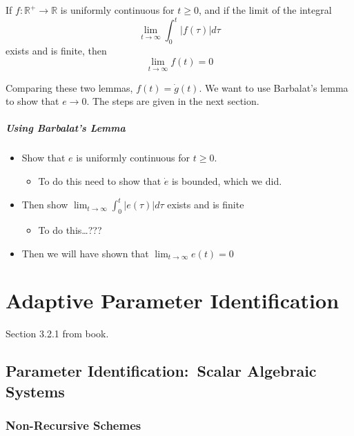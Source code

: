 \begin{lem-dan}
  If $f:\mathbb{R}^{+}\rightarrow\mathbb{R}$ is uniformly continuous for $t\geq0$, and if the limit of the integral
  \begin{equation*}
    \lim_{t\rightarrow\infty}\int_{0}^{t}|f(\tau)|d\tau
  \end{equation*}
  exists and is finite, then
  \begin{equation*}
    \lim_{t\rightarrow\infty}f(t)=0
  \end{equation*}
\end{lem-dan}

Comparing these two lemmas, $f(t)=\dot{g}(t)$.
We want to use Barbalat's lemma to show that $e\rightarrow0$.
The steps are given in the next section.

\paragraph{Using Barbalat's Lemma}

\begin{itemize}
  \item{Show that $e$ is uniformly continuous for $t\geq0$.}
  \begin{itemize}
    \item{To do this need to show that $\dot{e}$ is bounded, which we did.}
  \end{itemize}
  \item{Then show $\lim_{t\rightarrow\infty}\int_{0}^{t}|e(\tau)|d\tau$ exists and is finite}
  \begin{itemize}
    \item{To do this\dots???}
  \end{itemize}
  \item{Then we will have shown that $\lim_{t\rightarrow\infty}e(t)=0$}
\end{itemize}

\chapter{Adaptive Parameter Identification}

Section 3.2.1 from book.

\section{Parameter Identification:\ Scalar Algebraic Systems}

\subsection{Non-Recursive Schemes}

